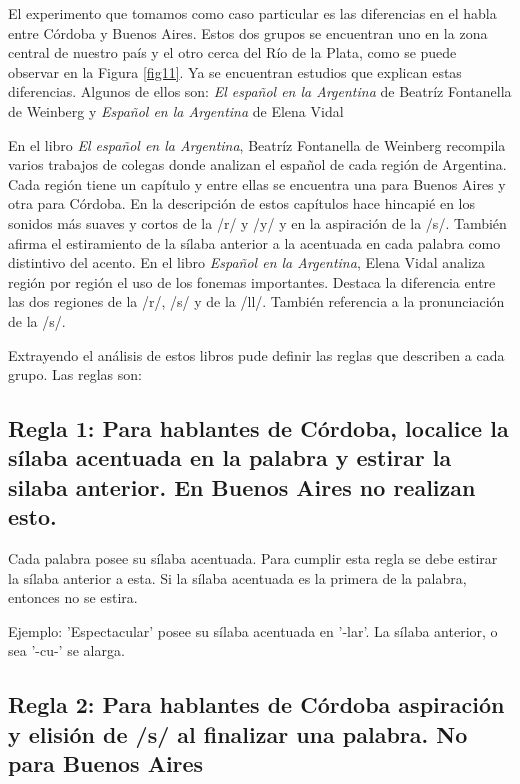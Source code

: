 \documentclass[11pt,a4paper,twoside]{tesis}
\begin{document}
El experimento que tomamos como caso particular es las diferencias en el habla entre Córdoba y Buenos Aires. Estos dos grupos se encuentran uno en la zona central de nuestro país y el otro cerca del Río de la Plata, como se puede observar en la Figura \ref{fig11}. Ya se encuentran estudios que explican estas diferencias. Algunos de ellos son: \textit{El español en la Argentina} de Beatríz Fontanella de Weinberg  y \textit{Español en la Argentina} de Elena Vidal  

En el libro \textit{El español en la Argentina}, Beatríz Fontanella de Weinberg recompila varios trabajos de colegas donde analizan el español de cada región de Argentina. Cada región tiene un capítulo y entre ellas se encuentra una para Buenos Aires y otra para Córdoba. En la descripción de estos capítulos hace hincapié en los sonidos más suaves y cortos de la /r/ y /y/ y en la aspiración de la /s/. También afirma el estiramiento de la sílaba anterior a la acentuada en cada palabra como distintivo del acento. En el libro \textit{Español en la Argentina}, Elena Vidal analiza región por región el uso de los fonemas importantes. Destaca la diferencia entre las dos regiones de la /r/, /s/ y de la /ll/. También referencia a la pronunciación de la /s/.

Extrayendo el análisis de estos libros pude definir las reglas que describen a cada grupo. Las reglas son: 

\subsection*{Regla 1: Para hablantes de Córdoba, localice la sílaba acentuada en la palabra y estirar la silaba anterior. En Buenos Aires no realizan esto. }

Cada palabra posee su sílaba acentuada. Para cumplir esta regla se debe estirar la sílaba anterior a esta. Si la sílaba acentuada es la primera de la palabra, entonces no se estira. 

Ejemplo: 'Espectacular' posee su sílaba acentuada en '-lar'. La sílaba anterior, o sea '-cu-' se alarga. 


\subsection*{Regla 2: Para hablantes de Córdoba aspiración y elisión de /s/ al finalizar una palabra. No para Buenos Aires}
\end{document}
